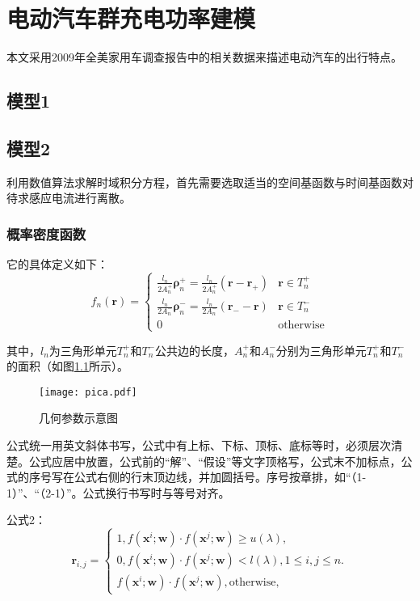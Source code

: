 \chapter{电动汽车群充电功率建模}
本文采用2009年全美家用车调查报告中的相关数据来描述电动汽车的出行特点。

\section{模型1}

\section{模型2}
利用数值算法求解时域积分方程，首先需要选取适当的空间基函数与时间基函数对待求感应电流进行离散。

\subsection{概率密度函数}
它的具体定义如下：
\begin{equation}
f_n(\bm{r})=
\begin{cases}
\frac{l_n}{2A_n^+}\bm{\rho}_n^+=\frac{l_n}{2A_n^+}(\bm{r}-\bm{r}_+)&\bm{r}\in T_n^+\\
\frac{l_n}{2A_n^-}\bm{\rho}_n^-=\frac{l_n}{2A_n^-}(\bm{r}_--\bm{r})&\bm{r}\in T_n^-\\
0&\text{otherwise}
\end{cases}
\end{equation}

其中，$l_n$为三角形单元$T_n^+$和$T_n^-$公共边的长度，$A_n^+$和$A_n^-$分别为三角形单元$T_n^+$和$T_n^-$的面积（如图\ref{pica}所示）。

\begin{figure}[h]
	\texttt{[image: pica.pdf]}
	\caption{几何参数示意图}
	\label{pica}
\end{figure}

公式统一用英文斜体书写，公式中有上标、下标、顶标、底标等时，必须层次清楚。公式应居中放置，公式前的“解”、“假设”等文字顶格写，公式末不加标点，公式的序号写在公式右侧的行末顶边线，并加圆括号。序号按章排，如“（1-1）”、“（2-1）”。公式换行书写时与等号对齐。

公式2：
\begin{equation}
\label{latent_binary_variable}
\bm{r}_{i,j}=
\begin{cases}
1,f(\bm{x}^{i};\bm{w})\cdot f(\bm{x}^{j};\bm{w})\geq u(\lambda),\\
0,f(\bm{x}^{i};\bm{w})\cdot f(\bm{x}^{j};\bm{w})< l(\lambda), 1\leq i,j\leq n.\\
f(\bm{x}^{i};\bm{w})\cdot f(\bm{x}^{j};\bm{w}),\text{otherwise},
\end{cases}
\end{equation}


